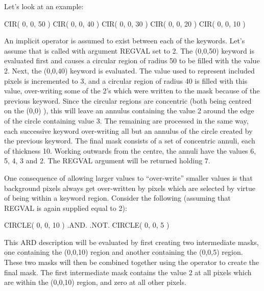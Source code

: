 \documentclass[11pt,nolof]{starlink}
\begin{document}
Let's look at an example:

\small
\begin{terminalv}
      CIR( 0, 0, 50 )
      CIR( 0, 0, 40 )
      CIR( 0, 0, 30 )
      CIR( 0, 0, 20 )
      CIR( 0, 0, 10 )
\end{terminalv}
\normalsize

An implicit  operator is assumed to exist between each of the 
keywords. Let's assume that  is called with argument REGVAL set to
2. The (0,0,50) keyword is evaluated first and causes a circular region
of radius 50 to be filled with the value 2. Next, the (0,0,40) keyword is
evaluated. The value used to represent included pixels is incremented to 3, and
a circular region of radius 40 is filled with this value, over-writing some of
the 2's which were written to the mask because of the previous keyword. Since
the circular regions are concentric (both being centred on the (0,0) ), this
will leave an annulus containing the value 2 around the edge of the circle
containing value 3. The remaining  are processed in the same way, each
successive keyword over-writing all but an annulus of the circle created by the
previous keyword. The final mask consists of a set of concentric annuli, each of
thickness 10. Working outwards from the centre, the annuli have the values 6, 5,
4, 3 and 2. The REGVAL argument will be returned holding 7.

One consequence of allowing larger values to ``over-write'' smaller values is
that background pixels always get over-written by pixels which are selected by
virtue of being within a keyword region. Consider the following (assuming that
REGVAL is again supplied equal to 2):

\small
\begin{terminalv}
      CIRCLE( 0, 0, 10 ) .AND. .NOT. CIRCLE( 0, 0, 5 )
\end{terminalv}
\normalsize

This ARD description will be evaluated by first creating two intermediate masks,
one containing the (0,0,10) region and another containing the
(0,0,5) region. These two masks will then be combined together using
the  operator to create the final mask. The first intermediate mask
contains the value 2 at all pixels which are within the (0,0,10) region,
and zero at all other pixels.
\end{document}
